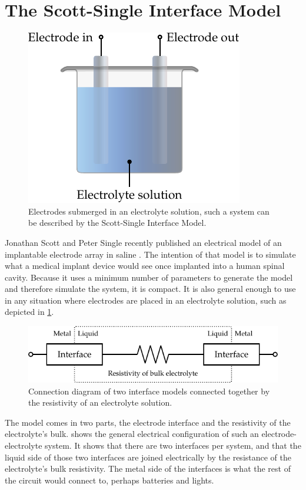 
\section{The Scott-Single Interface Model}

  \begin{figure}
    \centering
    \includegraphics{content/pt2/07-InterfaceModel/graphics/electrode-electrolyte}
    \caption{\label{fig:electrode-electrolyte}Electrodes submerged in an electrolyte solution, such a system can be described by the Scott-Single Interface Model.}
  \end{figure}

  Jonathan Scott and Peter Single recently published an electrical model of an implantable electrode array in saline \cite{ScottSingle2013}.
  The intention of that model is to simulate what a medical implant device would see once implanted into a human spinal cavity.
  Because it uses a minimum number of parameters to generate the model and therefore simulate the system, it is compact.
  It is also general enough to use in any situation where electrodes are placed in an electrolyte solution, such as depicted in \cref{fig:electrode-electrolyte}.

  \begin{figure}
    \centering
    \includegraphics{content/pt2/07-InterfaceModel/graphics/simpleElectrodeElectrolyteModel}
    \caption{\label{fig:pt2-simpleElectrodeElectrolyteModel}Connection diagram of two interface models connected together by the resistivity of an electrolyte solution.}
  \end{figure}
  The model comes in two parts, the electrode interface and the resistivity of the electrolyte's bulk.
   shows the general electrical configuration of such an electrode-electrolyte system.
  It shows that there are two interfaces per system, and that the liquid side of those two interfaces are joined electrically by the resistance of the electrolyte's bulk resistivity.
  The metal side of the interfaces is what the rest of the circuit would connect to, perhaps batteries and lights.


